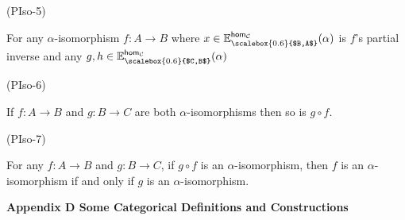 \begin{center}\end{center}
 
 
 
\par\noindent  (PIso-5) 
 
For any $\alpha$-isomorphism $f:A\to B$ where $x\in\mathbb{E}^{\mathsf{hom}_{\mathcal{C}}}_{\scalebox{0.6}{$B,A$}}(\alpha)$ is $f$’s partial inverse and any $g,h\in\mathbb{E}^{\mathsf{hom}_{\mathcal{C}}}_{\scalebox{0.6}{$C,B$}}(\alpha)$\par
 
\begin{center}\end{center}
 
 
 
\par\noindent  (PIso-6) 
 
If $f:A\to B$ and $g:B\to C$ are both $\alpha$-isomorphisms then so is $g\circ f$.\par
 
 
 
\par\noindent  (PIso-7) 
 
For any $f:A\to B$ and $g:B\to C$, if $g\circ f$ is an $\alpha$-isomorphism, then $f$ is an $\alpha$-isomorphism if and only if $g$ is an $\alpha$-isomorphism.\par
 
 
  
 
 


 
\par\medskip\noindent\textbf{Appendix D Some Categorical Definitions and Constructions}\par
 

